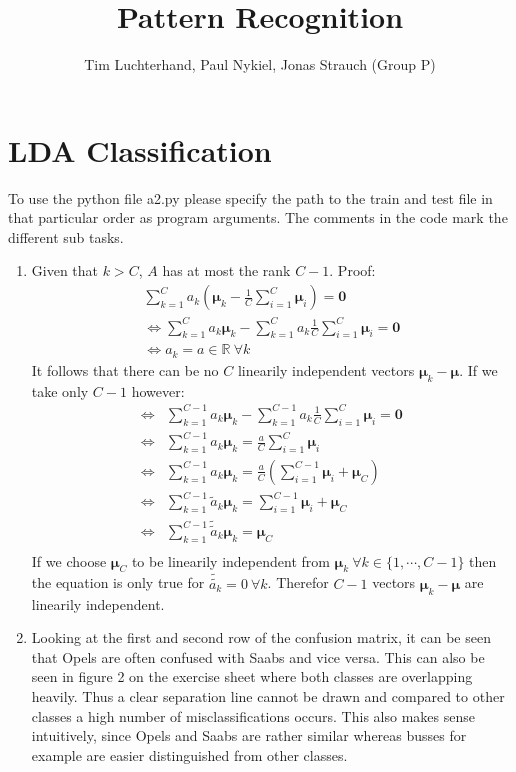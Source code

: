 \documentclass[DIN, pagenumber=false, fontsize=11pt, parskip=half]{scrartcl}
\title{Pattern Recognition}
\author{Tim Luchterhand, Paul Nykiel, Jonas Strauch (Group P)}
\newcommand{\R}[0]{\mathbb{R}}
\begin{document}
    \maketitle
    \section{LDA Classification}
    To use the python file a2.py please specify the path to the train and test file in that particular order as program arguments.
    The comments in the code mark the different sub tasks.
    \begin{enumerate}
        \item Given that $k > C$, $A$ has at most the rank $C-1$. Proof:
        \begin{align*}
            \sum_{k=1}^C a_k \left(\bm{\mu}_k - \frac{1}{C}\sum_{i=1}^C \bm{\mu}_i\right) = \mathbf{0} \\
            \Leftrightarrow \sum_{k=1}^C a_k \bm{\mu}_k - \sum_{k=1}^C a_k \frac{1}{C}\sum_{i=1}^C \bm{\mu}_i = \mathbf{0} \\
            \Leftrightarrow a_k = a \in \R \ \forall k
        \end{align*}
        It follows that there can be no $C$ linearily independent vectors $\bm{\mu}_k - \bm{\mu}$. If we take only $C-1$ however:
        \begin{align*}
            \Leftrightarrow &\sum_{k=1}^{C-1} a_k \bm{\mu}_k - \sum_{k=1}^{C-1} a_k \frac{1}{C}\sum_{i=1}^C \bm{\mu}_i = \mathbf{0} \\
            \Leftrightarrow &\sum_{k=1}^{C-1} a_k \bm{\mu}_k = \frac{a}{C} \sum_{i=1}^C \bm{\mu}_i \\
            \Leftrightarrow &\sum_{k=1}^{C-1} a_k \bm{\mu}_k = \frac{a}{C} \left(\sum_{i=1}^{C-1} \bm{\mu}_i + \bm{\mu}_C \right) \\
            \Leftrightarrow &\sum_{k=1}^{C-1} \widetilde{a}_k \bm{\mu}_k = \sum_{i=1}^{C-1} \bm{\mu}_i + \bm{\mu}_C \\
            \Leftrightarrow &\sum_{k=1}^{C-1} \widetilde{\widetilde{a}}_k \bm{\mu}_k = \bm{\mu}_C \\
        \end{align*}
        If we choose $\bm{\mu}_C$ to be linearily independent from $\bm{\mu}_k \ \forall k \in \{1, \cdots, C-1\}$ then the equation is
        only true for $\widetilde{\widetilde{a_k}} = 0 \ \forall k$. Therefor $C-1$ vectors $\bm{\mu}_k - \bm{\mu}$ are linearily independent.
        \setcounter{enumi}{4}
        \item Looking at the first and second row of the confusion matrix, it can be seen that Opels are often confused with Saabs
        and vice versa. This can also be seen in figure 2 on the exercise sheet where both classes are overlapping heavily. Thus
        a clear separation line cannot be drawn and compared to other classes a high number of misclassifications occurs. This also
        makes sense intuitively, since Opels and Saabs are rather similar whereas busses for example are easier distinguished from
        other classes.
    \end{enumerate}
\end{document}
